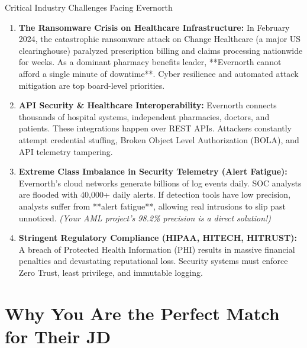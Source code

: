 \documentclass[11pt,a4paper]{article}
\begin{document}
\begin{techbox}{Critical Industry Challenges Facing Evernorth}
\begin{enumerate}
    \item \textbf{The Ransomware Crisis on Healthcare Infrastructure:}
    In February 2024, the catastrophic ransomware attack on Change Healthcare (a major US clearinghouse) paralyzed prescription billing and claims processing nationwide for weeks. As a dominant pharmacy benefits leader, **Evernorth cannot afford a single minute of downtime**. Cyber resilience and automated attack mitigation are top board-level priorities.
    \item \textbf{API Security \& Healthcare Interoperability:}
    Evernorth connects thousands of hospital systems, independent pharmacies, doctors, and patients. These integrations happen over REST APIs. Attackers constantly attempt credential stuffing, Broken Object Level Authorization (BOLA), and API telemetry tampering.
    \item \textbf{Extreme Class Imbalance in Security Telemetry (Alert Fatigue):}
    Evernorth's cloud networks generate billions of log events daily. SOC analysts are flooded with 40,000+ daily alerts. If detection tools have low precision, analysts suffer from **alert fatigue**, allowing real intrusions to slip past unnoticed. \textit{(Your AML project's 98.2\% precision is a direct solution!)}
    \item \textbf{Stringent Regulatory Compliance (HIPAA, HITECH, HITRUST):}
    A breach of Protected Health Information (PHI) results in massive financial penalties and devastating reputational loss. Security systems must enforce Zero Trust, least privilege, and immutable logging.
\end{enumerate}
\end{techbox}

\section{Why You Are the Perfect Match for Their JD}
\end{document}
